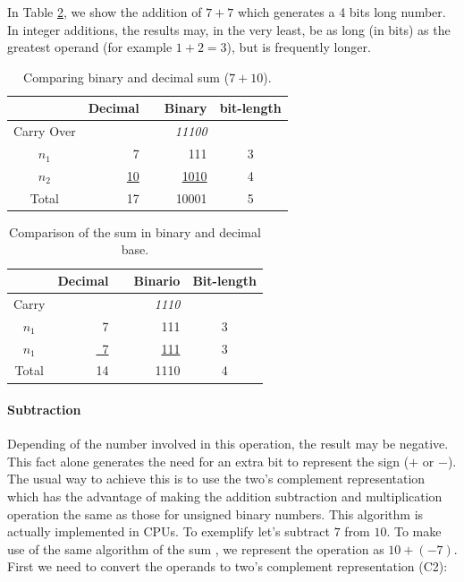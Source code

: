 \documentclass[10pt]{article}
\begin{document}
In Table \ref{tab:02}, we show the addition of $7 + 7$ which generates a 4 bits
long number. In integer additions, the results may, in the very least, be as
long (in bits) as the greatest operand (for example $1+2=3$), but is frequently
longer.

\begin{table}[ht]
	\centering
    \caption{Comparing binary and decimal sum ($7+10$).}
    \begin{tabular}{crrrc}
    \hline
    	  & Decimal & & Binary & bit-length \\
    \hline      
    Carry Over& 	& & \textit{11100} & \\
    $n_1$ & 7   & & 111 & 3 \\
    $n_2$ & \underline{10}	& & \underline{1010} & 4 \\
    Total & 17	& & 10001 & 5 \\
    \hline
	\end{tabular}
    \label{tab:01}
\end{table}
\begin{table}[ht]
    \centering
    \caption{Comparison of the sum in binary and decimal base.}
    \begin{tabular}{crrrc}
    \hline
    	  & Decimal & & Binario & Bit-length \\
    \hline      
    Carry & 	& & \textit{1110} & \\
    $n_1$ & 7   & & 111 & 3 \\
    $n_1$ & \underline{~7}	& & \underline{111} & 3 \\
    Total & 14	& & 1110 & 4 \\
    \hline
	\end{tabular}
    \label{tab:02}
\end{table}

\paragraph{Subtraction}

Depending of the number involved in this operation, the result may be negative.
This fact alone generates the need for an extra bit to represent the sign ($+$
or $-$). The usual way to achieve this is to use the  two's complement
\cite{flores1963logic} representation which has the advantage of making the
addition subtraction and multiplication operation the same as those for unsigned
binary numbers. This algorithm  is actually implemented in 
CPUs. To exemplify let's subtract $7$ from $10$. To make use of the
same algorithm of the sum , we represent the operation as $10+(-7)$. First we
need to convert the operands to two's complement representation (C2):
\end{document}

